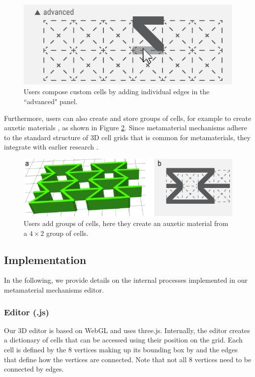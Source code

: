 \begin{figure} [h]
    \includegraphics[width=\textwidth]{chapters/metamaterial-mechanisms-FIG/24-advanced-cell-builder.pdf}
    \caption[Short figure name.]{Users compose custom cells by adding individual edges in the ``advanced" panel.
    \label{fig:24-advanced-cell-builder}}
\end{figure}

Furthermore, users can also create and store groups of cells, for example to create auxetic materials \cite{Saxena2016}, as shown in Figure \ref{fig:25-advanced-cell-groups}. Since metamaterial mechanisms adhere to the standard structure of 3D cell grids that is common for metamaterials, they integrate with earlier research \cite{Panetta2015, Schumacher2015}.

\begin{figure} [h]
    \includegraphics[width=\textwidth]{chapters/metamaterial-mechanisms-FIG/25-advanced-cell-groups.pdf}
    \caption[Short figure name.]{Users add groups of cells, here they create an auxetic material from a $4 \times 2$ group of cells.
    \label{fig:25-advanced-cell-groups}}
\end{figure}


\subsection{Implementation}
\label{section:mechanisms-editor}

In the following, we provide details on the internal processes implemented in our metamaterial mechanisms editor.

\subsubsection{Editor (.js)}
Our 3D editor is based on WebGL and uses three.js. Internally, the editor creates a dictionary of cells that can be accessed using their position on the grid. Each cell is defined by the 8 vertices making up its bounding box by and the edges that define how the vertices are connected. Note that not all 8 vertices need to be connected by edges. 

